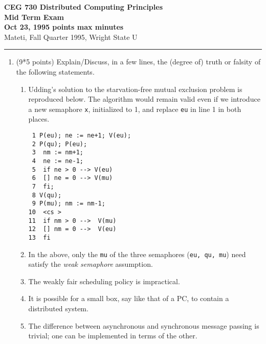 \def\CSP{{\sc csp}}
\def\RPC{{\sc rpc}}
\def\fat{\framebox[1mm]{\rule{0mm}{2mm}}}
\def\co{{\bf co}}
\def\oc{{\bf oc}}
\def\pa{{$\parallel$}}
\def\lb{$\langle$}
\def\rb{$\rangle$}
\def\ra{$\rightarrow$}
\def\await{{\bf await}}
\def\zand{\wedge}\def\zor{\vee}	\def\znot{\neg}

\parindent=0pt



{\bf CEG 
\large \bf 730 Distributed Computing Principles\\[5pt]
\large Mid Term Exam\\[10pt]
Oct 23, 1995  points max  minutes\\
}
\bigskip
{Mateti,  Fall Quarter 1995, Wright State U}\\[-5pt]
\hrule

\begin{enumerate}

\item (9*5 points)
Explain/Discuss, in a few lines, the (degree of) truth or falsity of
the following statements.

\begin{enumerate}
\item
Udding's solution to the starvation-free mutual exclusion problem is
reproduced below.
The algorithm would remain valid even if we introduce a new semaphore
\verb|x|, initialized to 1, and replace \verb|eu| in line 1 in both places.

\begin{verbatim}
 1 P(eu); ne := ne+1; V(eu);
 2 P(qu); P(eu);      
 3  nm := nm+1;      
 4  ne := ne-1;      
 5  if ne > 0 --> V(eu) 
 6  [] ne = 0 --> V(mu) 
 7  fi;        
 8 V(qu);        
 9 P(mu); nm := nm-1;      
10  <cs >        
11  if nm > 0 -->  V(mu)
12  [] nm = 0 -->  V(eu)
13  fi        
\end{verbatim}

\item In the above, only the \verb|mu| of
 the three semaphores ({\tt eu, qu, mu}) need satisfy the
{\sl weak semaphore} assumption.

\item The weakly fair scheduling policy is impractical.

\item It is possible for a small box, say like that of a PC, to
contain a distributed system.

\item
The difference between asynchronous and synchronous message passing is
trivial; one can be implemented in terms of the other.


\end{enumerate}
\end{enumerate}
